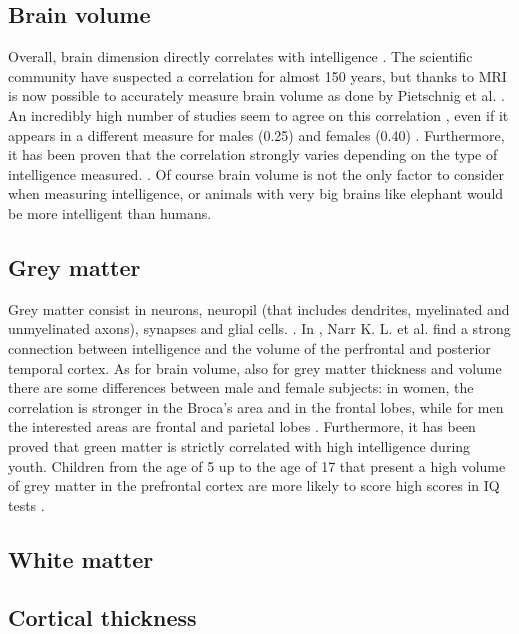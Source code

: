 \documentclass[conference]{IEEEtran}
\begin{document}
	\subsection{Brain volume}\label{BV}

		Overall, brain dimension directly correlates with intelligence \cite{c7}. The scientific community have suspected a correlation for almost 150 years, but thanks to MRI is now possible to accurately measure brain volume as done by Pietschnig et al. \cite{c1}.
		An incredibly high number of studies seem to agree on this correlation \cite{c8}, even if it appears in a different measure for males (0.25) and females (0.40) \cite{c9}.  Furthermore, it has been proven that the correlation strongly varies depending on the type of intelligence measured. \cite{c10}.
		Of course brain volume is not the only factor to consider when measuring intelligence, or animals with very big brains like elephant would be more intelligent than humans.

	\subsection{Grey matter}\label{GM}

		Grey matter consist in neurons, neuropil (that includes dendrites, myelinated and unmyelinated axons), synapses and glial cells. \cite{c11}. In \cite{c2}, Narr K. L. et al. find a strong connection between intelligence and the volume of the perfrontal and posterior temporal cortex. As for brain volume, also for grey matter thickness and volume there are some differences between male and female subjects: in women, the correlation is stronger in the Broca's area and in the frontal lobes, while for men the interested areas are frontal and parietal lobes \cite{c12}.
		Furthermore, it has been proved that green matter is strictly correlated with high intelligence during youth.  Children from the age of 5 up to the age of 17 that present a high volume of grey matter in the prefrontal cortex are more likely to score high scores in IQ tests \cite{c13}.

	\subsection{White matter}\label{WM}


	\subsection{Cortical thickness}\label{CT}
\end{document}
